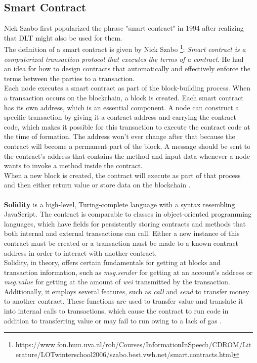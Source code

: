 \subsection{Smart Contract}
Nick Szabo \cite{Szabo} first popularized the phrase "smart contract" in 1994 after realizing that DLT might also be used for them. \\
The definition of a smart contract is given by Nick Szabo \footnote{https://www.fon.hum.uva.nl/rob/Courses/InformationInSpeech/CDROM/Literature/LOTwinterschool2006/szabo.best.vwh.net/smart.contracts.html}: \textit{Smart contract is a computerized transaction protocol that executes the terms of a contract}. He had an idea for how to design contracts that automatically and effectively enforce the terms between the parties to a transaction. \\
Each node executes a smart contract as part of the block-building process. When a transaction occurs on the blockchain, a block is created.
Each smart contract has its own address, which is an essential component. A node can construct a specific transaction by giving it a contract address and carrying the contract code, which makes it possible for this transaction to execute the contract code at the time of formation.
The address won't ever change after that because the contract will become a permanent part of the block. A message should be sent to the contract's address that contains the method and input data whenever a node wants to invoke a method inside the contract. \\
When a new block is created, the contract will execute as part of that process and then either return value or store data on the blockchain \cite{Payrott}.\\
\\
\textbf{Solidity} is a high-level, Turing-complete language with a syntax resembling JavaScript. The contract is comparable to classes in object-oriented programming languages, which have fields for persistently storing contracts and methods that both internal and external transactions can call. Either a new instance of this contract must be created or a transaction must be made to a known contract address in order to interact with another contract.\\
Solidity, in theory, offers certain fundamentals for getting at blocks and transaction information, such as \textit{msg.sender} for getting at an account's address or \textit{msg.value} for getting at the amount of \textit{wei} transmitted by the transaction. Additionally, it employs several features, such as \textit{call} and \textit{send} to transfer money to another contract. These functions are used to transfer value and translate it into internal calls to transactions, which cause the contract to run code in addition to transferring value or may fail to run owing to a lack of gas \cite{Ilya}.